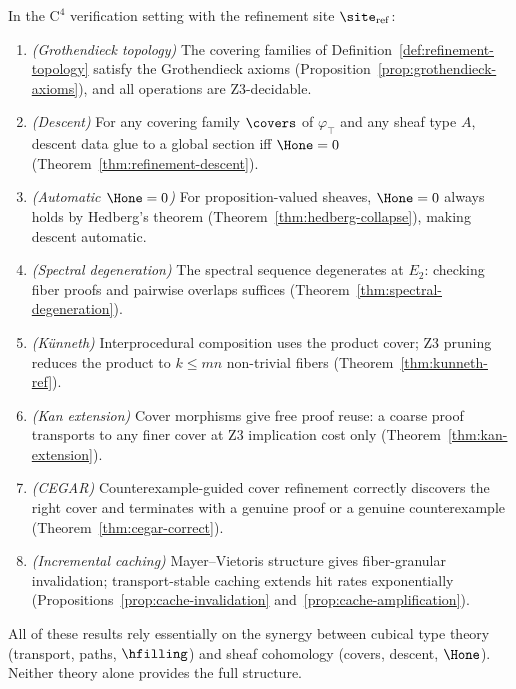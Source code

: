 \begin{theorem}
\label{thm:main-results}
In the $\mathrm{C}^4$ verification setting with the refinement site
$\site_{\mathrm{ref}}$:
\begin{enumerate}
\item \emph{(Grothendieck topology)} The covering families of
  Definition~\ref{def:refinement-topology} satisfy the Grothendieck axioms
  (Proposition~\ref{prop:grothendieck-axioms}), and all operations are
  Z3-decidable.
\item \emph{(Descent)} For any covering family $\covers$ of $\varphi_\top$
  and any sheaf type $A$, descent data glue to a global section
  iff $\Hone = 0$ (Theorem~\ref{thm:refinement-descent}).
\item \emph{(Automatic $\Hone = 0$)} For proposition-valued sheaves,
  $\Hone = 0$ always holds by Hedberg's theorem
  (Theorem~\ref{thm:hedberg-collapse}), making descent automatic.
\item \emph{(Spectral degeneration)} The spectral sequence degenerates at
  $E_2$: checking fiber proofs and pairwise overlaps suffices
  (Theorem~\ref{thm:spectral-degeneration}).
\item \emph{(Künneth)} Interprocedural composition uses the product cover;
  Z3 pruning reduces the product to $k \le mn$ non-trivial fibers
  (Theorem~\ref{thm:kunneth-ref}).
\item \emph{(Kan extension)} Cover morphisms give free proof reuse:
  a coarse proof transports to any finer cover at Z3 implication cost only
  (Theorem~\ref{thm:kan-extension}).
\item \emph{(CEGAR)} Counterexample-guided cover refinement correctly
  discovers the right cover and terminates with a genuine proof or
  a genuine counterexample (Theorem~\ref{thm:cegar-correct}).
\item \emph{(Incremental caching)} Mayer--Vietoris structure gives
  fiber-granular invalidation; transport-stable caching extends
  hit rates exponentially (Propositions~\ref{prop:cache-invalidation}
  and~\ref{prop:cache-amplification}).
\end{enumerate}
All of these results rely essentially on the synergy between cubical
type theory (transport, paths, $\hfilling$) and sheaf cohomology (covers,
descent, $\Hone$).  Neither theory alone provides the full structure.
\end{theorem}

